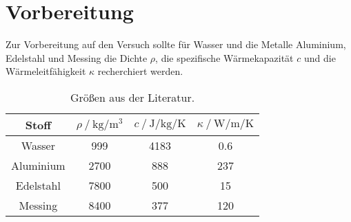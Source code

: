 \section{Vorbereitung}
\label{sec:vorbereitung}

Zur Vorbereitung auf den Versuch sollte für Wasser und die Metalle
Aluminium, Edelstahl und Messing die Dichte $\rho$,
die spezifische Wärmekapazität $c$ und die Wärmeleitfähigkeit $\kappa$ recherchiert werden.

\begin{table}
    \centering
    \caption{Größen aus der Literatur.}
    \label{tab:daten_vorbereitung}
    \begin{tabular}{c c c c}
     \toprule
     Stoff &
     $\rho \mathbin{/} \si{\kilo\gram\per\cubic\meter}$ &
     $c \mathbin{/} \si{\joule\per\kilo\gram\per\kelvin}$ &
     $\kappa \mathbin{/} \si{\watt\per\meter\per\kelvin}$ \\
     \midrule
     Wasser    & 999  \cite{chemie_de_4} & 4183 \cite{chemie_de_4} & 0.6 \cite{chemie_de_2} \\
     Aluminium & 2700 \cite{chemie_de_1} & 888  \cite{chemie_de_1} & 237 \cite{chemie_de_1} \\
     Edelstahl & 7800 \cite{chemie_de_1} & 500  \cite{chemie_de_1} & 15  \cite{chemie_de_1} \\ %
     Messing   & 8400 \cite{chemie_de_3} & 377  \cite{chemie_de_3} & 120 \cite{chemie_de_2} \\
     \bottomrule
    \end{tabular}
\end{table}
